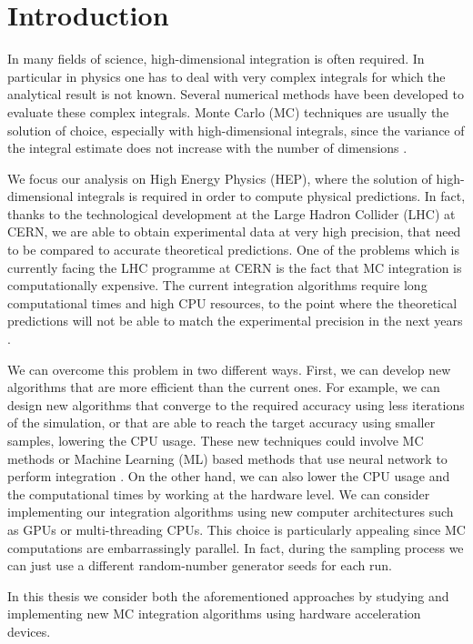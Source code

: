 \documentclass[../main/main.tex]{subfiles}
\begin{document}
\chapter*{Introduction}

In many fields of science, high-dimensional integration is often required. In particular in physics one has to deal with very complex integrals for which the analytical result is not known. Several numerical methods have been developed to evaluate these complex integrals. Monte Carlo (MC) techniques are usually the solution of choice, especially with high-dimensional integrals, since the variance of the integral estimate does not increase with the number of dimensions \cite{Press:1992zz}.

We focus our analysis on High Energy Physics (HEP), where the solution of high-dimensional integrals is required in order to compute physical predictions. In fact, thanks to the technological development at the Large Hadron Collider (LHC) at CERN, we are able to obtain experimental data at very high precision, that need to be compared to accurate theoretical predictions.
One of the problems which is currently facing the LHC programme at CERN \cite{Dainese:2703572} is the fact that MC integration is computationally expensive. The current integration algorithms require long computational times  and high CPU resources, to the point where the theoretical predictions will not be able to match the experimental precision in the next years \cite{Buckley:2019wov, Apollinari:2017cqg, Abada:2019zxq}.

We can overcome this problem in two different ways. First, we can develop new algorithms that are more efficient than the current ones. For example, we can design new algorithms that converge to the required accuracy using less iterations of the simulation, or that are able to reach the target accuracy using smaller samples, lowering the CPU usage. These new techniques could involve MC methods or Machine Learning (ML) based methods that use neural network to perform integration \cite{Bendavid:2017zhk}.
On the other hand, we can also lower the CPU usage and the computational times  by working at the hardware level.
We can consider implementing our integration algorithms using new computer architectures such as GPUs or multi-threading CPUs. This choice is particularly appealing since MC computations are embarrassingly parallel. In fact, during the sampling process we can just use a different random-number generator seeds for each run.

In this thesis we consider both the aforementioned approaches by studying and implementing new MC integration algorithms using hardware acceleration devices.
\end{document}
